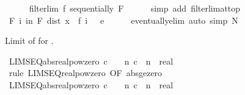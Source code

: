 \begin{isabellebody}
\ \ \ \ \isamarkupfalse%
\ {\isacartoucheopen}filterlim\ f\ sequentially\ F{\isacartoucheclose}\isanewline
\ \ \ \ \isamarkupfalse%
\ {\isacharparenleft}{\kern0pt}simp\ add{\isacharcolon}{\kern0pt}\ filterlim{\isacharunderscore}{\kern0pt}at{\isacharunderscore}{\kern0pt}top{\isacharparenright}{\kern0pt}\isanewline
\ \ \isamarkupfalse%
\ \isamarkupfalse%
\ {\isachardoublequoteopen}{\isasymforall}\isactrlsub F\ i\ in\ F{\isachardot}{\kern0pt}\ dist\ {\isacharparenleft}{\kern0pt}x\ {\isacharcircum}{\kern0pt}\ f\ i{\isacharparenright}{\kern0pt}\ {}\ {\isacharless}{\kern0pt}\ e{\isachardoublequoteclose}\isanewline
\ \ \ \ \isamarkupfalse%
\ eventually{\isacharunderscore}{\kern0pt}elim\ {\isacharparenleft}{\kern0pt}auto\ simp{\isacharcolon}{\kern0pt}\ N{\isacharparenright}{\kern0pt}\isanewline
{}\isamarkupfalse%
%
\endisatagproof
{\isafoldproof}%
%
\isadelimproof
%
\endisadelimproof
%
\begin{isamarkuptext}%
Limit of  for .%
\end{isamarkuptext}\isamarkuptrue%
\isamarkupfalse%
\ LIMSEQ{\isacharunderscore}{\kern0pt}abs{\isacharunderscore}{\kern0pt}realpow{\isacharunderscore}{\kern0pt}zero{\isacharcolon}{\kern0pt}\ {\isachardoublequoteopen}{\isasymbar}c{\isasymbar}\ {\isacharless}{\kern0pt}\ {}\ {\isasymLongrightarrow}\ {\isacharparenleft}{\kern0pt}{\isasymlambda}n{\isachardot}{\kern0pt}\ {\isasymbar}c{\isasymbar}\ {\isacharcircum}{\kern0pt}\ n\ {\isacharcolon}{\kern0pt}{\isacharcolon}{\kern0pt}\ real{\isacharparenright}{\kern0pt}\ {\isasymlonglonglongrightarrow}\ {}{\isachardoublequoteclose}\isanewline
%
\isadelimproof
\ \ %
\endisadelimproof
%
\isatagproof
{}\isamarkupfalse%
\ {\isacharparenleft}{\kern0pt}rule\ LIMSEQ{\isacharunderscore}{\kern0pt}realpow{\isacharunderscore}{\kern0pt}zero\ {\isacharbrackleft}{\kern0pt}OF\ abs{\isacharunderscore}{\kern0pt}ge{\isacharunderscore}{\kern0pt}zero{\isacharbrackright}{\kern0pt}{\isacharparenright}{\kern0pt}%
\endisatagproof
{\isafoldproof}%
%
\isadelimproof
\isanewline
%
\endisadelimproof
\isanewline
{}\isamarkupfalse%
\ LIMSEQ{\isacharunderscore}{\kern0pt}abs{\isacharunderscore}{\kern0pt}realpow{\isacharunderscore}{\kern0pt}zero{}{\isacharcolon}{\kern0pt}\ {\isachardoublequoteopen}{\isasymbar}c{\isasymbar}\ {\isacharless}{\kern0pt}\ {}\ {\isasymLongrightarrow}\ {\isacharparenleft}{\kern0pt}{\isasymlambda}n{\isachardot}{\kern0pt}\ c\ {\isacharcircum}{\kern0pt}\ n\ {\isacharcolon}{\kern0pt}{\isacharcolon}{\kern0pt}\ real{\isacharparenright}{\kern0pt}\ {\isasymlonglonglongrightarrow}\ {}{\isachardoublequoteclose}\isanewline

\end{isabellebody}
